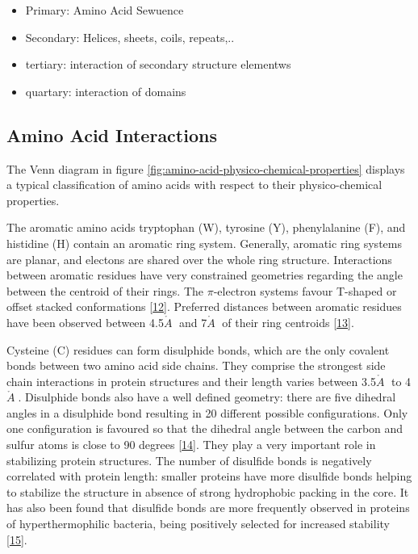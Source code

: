 \documentclass[12pt,a4paper,twoside]{book}
\providecommand{\tightlist}{%
  \setlength{\itemsep}{0pt}\setlength{\parskip}{0pt}}
\newcommand{\angstrom}{\mathring{A} \;}
\theoremstyle{definition}
\theoremstyle{definition}
\theoremstyle{remark}
\begin{document}
\begin{itemize}
\tightlist
\item
  Primary: Amino Acid Sewuence
\item
  Secondary: Helices, sheets, coils, repeats,..
\item
  tertiary: interaction of secondary structure elementws
\item
  quartary: interaction of domains
\end{itemize}

\subsection{Amino Acid Interactions}\label{amino-acid-interactions}

The Venn diagram in figure
\ref{fig:amino-acid-physico-chemical-properties} displays a typical
classification of amino acids with respect to their physico-chemical
properties.

The aromatic amino acids tryptophan (W), tyrosine (Y), phenylalanine
(F), and histidine (H) contain an aromatic ring system. Generally,
aromatic ring systems are planar, and electons are shared over the whole
ring structure. Interactions between aromatic residues have very
constrained geometries regarding the angle between the centroid of their
rings. The \(\pi\)-electron systems favour T-shaped or offset stacked
conformations {[}\protect\hyperlink{ref-Waters2002}{12}{]}. Preferred
distances between aromatic residues have been observed between
4.5\(\angstrom\) and 7\(\angstrom\) of their ring centroids
{[}\protect\hyperlink{ref-Burley1985}{13}{]}.

Cysteine (C) residues can form disulphide bonds, which are the only
covalent bonds between two amino acid side chains. They comprise the
strongest side chain interactions in protein structures and their length
varies between 3.5\(\angstrom\) to 4\(\angstrom\). Disulphide bonds also
have a well defined geometry: there are five dihedral angles in a
disulphide bond resulting in 20 different possible configurations. Only
one configuration is favoured so that the dihedral angle between the
carbon and sulfur atoms is close to 90 degrees
{[}\protect\hyperlink{ref-Thornton1981}{14}{]}. They play a very
important role in stabilizing protein structures. The number of
disulfide bonds is negatively correlated with protein length: smaller
proteins have more disulfide bonds helping to stabilize the structure in
absence of strong hydrophobic packing in the core. It has also been
found that disulfide bonds are more frequently observed in proteins of
hyperthermophilic bacteria, being positively selected for increased
stability {[}\protect\hyperlink{ref-Bastolla2005}{15}{]}.
\end{document}
